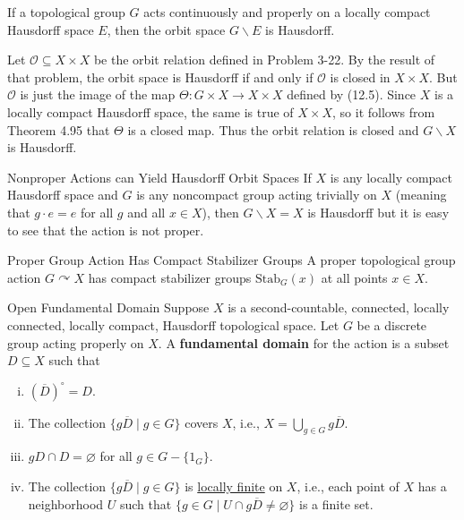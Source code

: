 \documentclass{report}
\def\acts{\curvearrowright}
\begin{document}
\begin{proposition}{}{}
	If a topological group $G$ acts continuously and properly on a locally compact Hausdorff space $E$, then the orbit space $G\backslash E$ is Hausdorff.
\end{proposition}
\begin{prf}
 Let $\mathcal{O} \subseteq X\times X$ be the orbit relation defined in Problem 3-22. By the result of that problem, the orbit space is Hausdorff if and only if $\mathcal{O}$ is closed in $X\times X$. But $\mathcal{O}$ is just the image of the map $\Theta: G \times X \rightarrow X \times X$ defined by (12.5). Since $X$ is a locally compact Hausdorff space, the same is true of $X \times X$, so it follows from Theorem 4.95 that $\Theta$ is a closed map. Thus the orbit relation is closed and $G\backslash X$ is Hausdorff.
\end{prf}

\begin{example}{Nonproper Actions can Yield Hausdorff Orbit Spaces}{} 
	If $X$ is any locally compact Hausdorff space and $G$ is any noncompact group acting trivially on $X$ (meaning that $g \cdot e=e$ for all $g$ and all $x\in X$), then $G\backslash X =X$ is Hausdorff but it is easy to see that the action is not proper.
\end{example}

\begin{proposition}{Proper Group Action Has Compact Stabilizer Groups}{}
	A proper topological group action $G\acts X$ has compact stabilizer groups $\mathrm{Stab}_G(x)$ at all points $x\in X$.
\end{proposition}

\begin{definition}{Open Fundamental Domain}{}
	Suppose $X$ is a second-countable, connected, locally connected, locally compact, Hausdorff topological space. Let $G$ be a discrete group acting properly on $X$. A \textbf{fundamental domain} for the action is a subset $D \subseteq X$ such that
	\begin{enumerate}[(i)]
		\item $\left(\overline{D}\right)^{\circ}=D$.
		\item The collection $\{g \overline{D} \mid g \in G\}$ covers $X$, i.e., $X=\bigcup_{g \in G} g \overline{D}$.
		\item $gD \cap D=\varnothing$ for all $g \in G-\{1_G\}$.
		\item The collection $\{g \overline{D} \mid g \in G\}$ is \hyperref[th:locally_finite_subset_family]{locally finite} on $X$, i.e., each point of $X$ has a neighborhood $U$ such that $\{g \in G \mid U \cap g \overline{D} \neq \varnothing\}$ is a finite set.
	\end{enumerate}
\end{definition}
\end{document}
